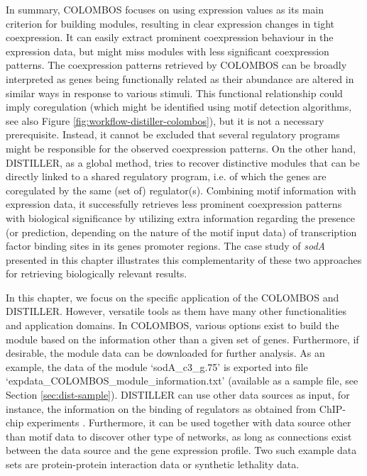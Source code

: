 In summary, COLOMBOS focuses on using expression values as its main criterion
for building modules, resulting in clear expression changes in tight
coexpression. It can easily extract prominent coexpression behaviour in the
expression data, but might miss modules with less significant coexpression
patterns. The coexpression patterns retrieved by COLOMBOS can be broadly
interpreted as genes being functionally related as their abundance are altered
in similar ways in response to various stimuli. This functional relationship
could imply coregulation (which might be identified using motif detection
algorithms, see also Figure \ref{fig:workflow-distiller-colombos}), but it is not
a necessary prerequisite.
Instead, it cannot be excluded that several regulatory programs might be 
responsible for the observed coexpression patterns.
On the other hand, DISTILLER, as a global method, tries to recover
distinctive modules that can be directly linked to a shared regulatory
program, i.e. of which the genes are coregulated by the same (set of)
regulator(s). Combining motif information with expression data, it
successfully retrieves less prominent coexpression patterns with
biological significance by utilizing extra information regarding the
presence (or prediction, depending on the nature of the motif input
data) of transcription factor binding sites in its genes promoter
regions. The case study of \textit{sodA} presented in this chapter illustrates 
this complementarity of these two approaches for retrieving biologically 
relevant results. 

In this chapter, we focus on the specific application of the COLOMBOS and
DISTILLER.  However, versatile tools as them have many other functionalities
and application domains.
%
In COLOMBOS, various options exist to build the module based on the information
other than a given set of genes.  Furthermore, if desirable, the module data
can be downloaded for further analysis.  As an example, the data of the module
`sodA\_c3\_g.75' is exported into file
`expdata\_COLOMBOS\_module\_information.txt' (available as a sample file, see
Section \ref{sec:dist-sample}).
%
DISTILLER can use other data sources as input, for instance, the information 
on the binding of regulators as obtained from ChIP-chip experiments 
\cite{Lemmens2009, Lemmens2006}.
Furthermore, it can be used together with data source other than motif data to 
discover other type of networks, as long as connections exist between the data 
source and the gene expression profile. 
Two such example data sets are protein-protein interaction data or synthetic
lethality data.



